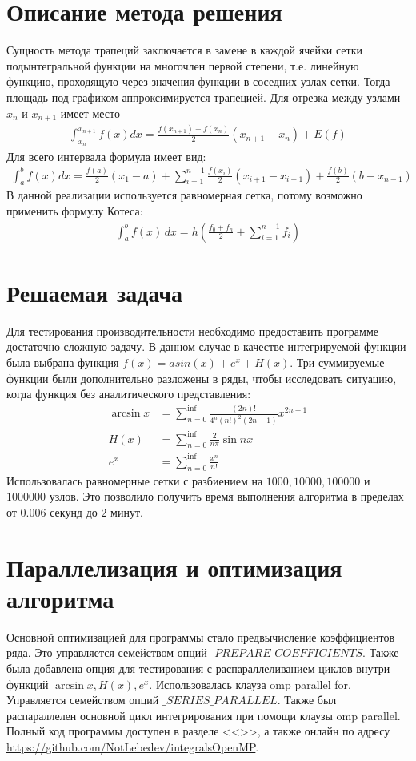 \documentclass[a4paper,12pt,titlepage,finall]{article}
\begin{document}
\section{Описание метода решения}
Сущность метода трапеций заключается в замене в каждой ячейки сетки подынтегральной функции на многочлен первой степени, т.е. линейную функцию, проходящую через значения функции в соседних узлах сетки. Тогда площадь под графиком аппроксимируется трапецией. Для отрезка между узлами $x_n$ и $x_{n+1}$ имеет место
\begin{align*}
\int^{x_{n+1}}_{x_n} f(x) dx = \frac{f(x_{n+1}) + f(x_{n})}{2}(x_{n+1} - x_n) + E(f)
\end{align*}
Для всего интервала формула имеет вид:
\begin{align*}
\int^b_a f(x) dx = \frac{f(a)}{2} (x_1 - a) + \sum_{i=1}^{n-1} \frac{f(x_i)}{2} (x_{i+1} - x_{i-1}) + \frac{f(b)}{2} (b - x_{n-1})
\end{align*}
В данной реализации используется равномерная сетка, потому возможно применить формулу Котеса:
\begin{align*}
\int^b_a f(x)\,dx = h \left( \frac{f_0 + f_n}{2} + \sum_{i=1}^{n-1} f_i \right)
\end{align*}

\section{Решаемая задача}
Для тестирования производительности необходимо предоставить программе достаточно сложную задачу. В данном случае в качестве интегрируемой функции была выбрана функция $f(x) = asin(x) + e^x + H(x)$. Три суммируемые функции были дополнительно разложены в ряды, чтобы исследовать ситуацию, когда функция без аналитического представления:
\begin{align*}
\arcsin x &= \sum^{\inf}_{n=0} \frac{(2n)!}{4^n (n!)^2 (2n+1)} x^{2n+1} \\
H(x) &= \sum^{\inf}_{n=0} \frac{2}{n \pi} \sin nx\\
e^x &=  \sum^{\inf}_{n=0} \frac{x^n}{n!}
\end{align*}
Использовалась равномерные сетки с разбиением на $1000, 10 000, 100 000$ и $1 000 000$ узлов. Это позволило получить время выполнения алгоритма в пределах от $0.006$ секунд до $2$ минут.

\section{Параллелизация и оптимизация алгоритма}
Основной оптимизацией для программы стало предвычисление коэффициентов ряда. Это управляется семейством опций $\_PREPARE\_COEFFICIENTS$. Также была добавлена опция для тестирования с распараллеливанием циклов внутри функций $\arcsin x, H(x), e^x$. Использовалась клауза omp parallel for. Управляется семейством опций $\_SERIES\_PARALLEL$. Также был распараллелен основной цикл интегрирования при помощи клаузы omp parallel.  Полный код программы доступен в разделе <<>>, а также онлайн по адресу \url{https://github.com/NotLebedev/integralsOpenMP}.
\end{document}
